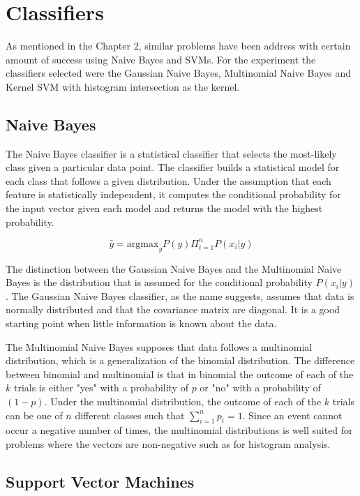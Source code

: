 \section{Classifiers}

As mentioned in the Chapter 2, similar problems have been address with
certain amount of success using Naive Bayes and SVMs. For the experiment the 
classifiers selected were the Gaussian Naive Bayes, Multinomial Naive Bayes and 
Kernel SVM with histogram intersection as the kernel. 

\subsection{Naive Bayes}

The Naive Bayes classifier is a statistical classifier that selects the most-likely 
class given a particular data point. The classifier builds a statistical model for each class that 
follows a given distribution. Under the assumption that each
feature is statistically independent, it computes the conditional probability for 
the input vector given each model and returns the model with the highest probability.

\[ \hat{y} = \text{argmax}_{y} P(y) \Pi_{i=1}^{n} P(x_i|y)\]

The distinction between the Gaussian Naive Bayes and the Multinomial Naive Bayes is the 
distribution that is assumed for the conditional probability $P(x_i | y)$.  The Gaussian Naive
Bayes classifier, as the name suggests, assumes that data is normally distributed and 
that the covariance matrix are diagonal. It is a good 
starting point when little information is known about the data. 

The Multinomial Naive Bayes supposes that data follows a multinomial distribution, which is a generalization 
of the binomial distribution.  The difference between binomial and multinomial is that in binomial the outcome 
of each of the $k$ trials is either "yes" with a probability of $p$ or "no" with a probability of $(1-p)$. Under the multinomial
distribution, the outcome of each of the $k$ trials can be one of $n$ different classes such that $\sum^n_{i=1}p_i = 1$.
Since an event cannot occur a negative number of times, the multinomial distributions is well suited for problems where 
the vectors are non-negative such as for histogram analysis. 

\subsection{Support Vector Machines}

